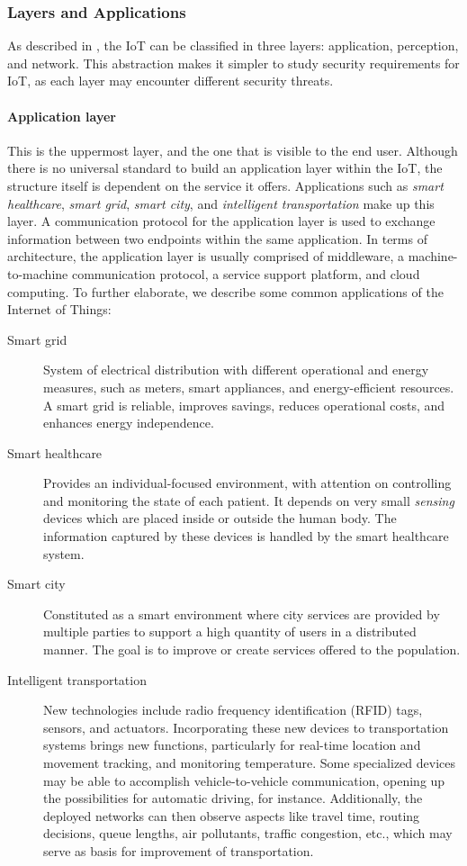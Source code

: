 \documentclass[12pt]{article}
\begin{document}
\subsubsection{Layers and Applications}
As described in \cite{ALABA201710}, the IoT can be classified in three layers: application, perception, and network. This abstraction makes it simpler to study security requirements for IoT, as each layer may encounter different security threats. 

\paragraph{Application layer} This is the uppermost layer, and the one that is visible to the end user. Although there is no universal standard to build an application layer within the IoT, the structure itself is dependent on the service it offers. Applications such as \emph{smart healthcare}, \emph{smart grid}, \emph{smart city}, and \emph{intelligent transportation} make up this layer. A communication protocol for the application layer is used to exchange information between two endpoints within the same application. In terms of architecture, the application layer is usually comprised of middleware, a machine-to-machine communication protocol, a service support platform, and cloud computing. To further elaborate, we describe some common applications of the Internet of Things:

\begin{description}
\item [Smart grid] System of electrical distribution with different operational and energy measures, such as meters, smart appliances, and energy-efficient resources. A smart grid is reliable, improves savings, reduces operational costs, and enhances energy independence. 
\item [Smart healthcare] Provides an individual-focused environment, with attention on controlling and monitoring the state of each patient. It depends on very small \emph{sensing} devices which are placed inside or outside the human body. The information captured by these devices is handled by the smart healthcare system.
\item [Smart city] Constituted as a smart environment where city services are provided by multiple parties to support a high quantity of users in a distributed manner. The goal is to improve or create services offered to the population.
\item [Intelligent transportation] New technologies include radio frequency identification (RFID) tags, sensors, and actuators. Incorporating these new devices to transportation systems brings new functions, particularly for real-time location and movement tracking, and monitoring temperature. Some specialized devices may be able to accomplish vehicle-to-vehicle communication, opening up the possibilities for automatic driving, for instance. Additionally, the deployed networks can then observe aspects like travel time, routing decisions, queue lengths, air pollutants, traffic congestion, etc., which may serve as basis for improvement of transportation.
\end{description}
\end{document}
